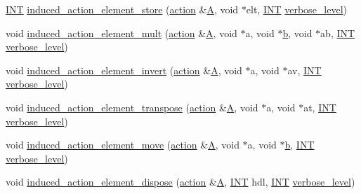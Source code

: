 \begin{DoxyCompactItemize}
\item 
\mbox{\hyperlink{galois_8h_a09fddde158a3a20bd2dcadb609de11dc}{I\+NT}} \mbox{\hyperlink{interface_8_c_a23d42fb239ba7e886b1fb9fc96f1a3be}{induced\+\_\+action\+\_\+element\+\_\+store}} (\mbox{\hyperlink{classaction}{action}} \&\mbox{\hyperlink{simeon_8_c_a97833f04c3a9c008df5521a2fc291bb4}{A}}, void $\ast$elt, \mbox{\hyperlink{galois_8h_a09fddde158a3a20bd2dcadb609de11dc}{I\+NT}} \mbox{\hyperlink{simeon_8_c_a818073fbcc2f439e7c56952f67386122}{verbose\+\_\+level}})
\item 
void \mbox{\hyperlink{interface_8_c_a7b00701d128922145960b4c15307113c}{induced\+\_\+action\+\_\+element\+\_\+mult}} (\mbox{\hyperlink{classaction}{action}} \&\mbox{\hyperlink{simeon_8_c_a97833f04c3a9c008df5521a2fc291bb4}{A}}, void $\ast$a, void $\ast$\mbox{\hyperlink{alphabet2_8_c_a148e3876077787926724625411d6e7a9}{b}}, void $\ast$ab, \mbox{\hyperlink{galois_8h_a09fddde158a3a20bd2dcadb609de11dc}{I\+NT}} \mbox{\hyperlink{simeon_8_c_a818073fbcc2f439e7c56952f67386122}{verbose\+\_\+level}})
\item 
void \mbox{\hyperlink{interface_8_c_a9b7e3c76b30897cb2b62a974e063ce12}{induced\+\_\+action\+\_\+element\+\_\+invert}} (\mbox{\hyperlink{classaction}{action}} \&\mbox{\hyperlink{simeon_8_c_a97833f04c3a9c008df5521a2fc291bb4}{A}}, void $\ast$a, void $\ast$av, \mbox{\hyperlink{galois_8h_a09fddde158a3a20bd2dcadb609de11dc}{I\+NT}} \mbox{\hyperlink{simeon_8_c_a818073fbcc2f439e7c56952f67386122}{verbose\+\_\+level}})
\item 
void \mbox{\hyperlink{interface_8_c_ad1379970ade84fe3a44f26f5ec500db4}{induced\+\_\+action\+\_\+element\+\_\+transpose}} (\mbox{\hyperlink{classaction}{action}} \&\mbox{\hyperlink{simeon_8_c_a97833f04c3a9c008df5521a2fc291bb4}{A}}, void $\ast$a, void $\ast$at, \mbox{\hyperlink{galois_8h_a09fddde158a3a20bd2dcadb609de11dc}{I\+NT}} \mbox{\hyperlink{simeon_8_c_a818073fbcc2f439e7c56952f67386122}{verbose\+\_\+level}})
\item 
void \mbox{\hyperlink{interface_8_c_a7b319593ee737d9c1ab5bc6223377541}{induced\+\_\+action\+\_\+element\+\_\+move}} (\mbox{\hyperlink{classaction}{action}} \&\mbox{\hyperlink{simeon_8_c_a97833f04c3a9c008df5521a2fc291bb4}{A}}, void $\ast$a, void $\ast$\mbox{\hyperlink{alphabet2_8_c_a148e3876077787926724625411d6e7a9}{b}}, \mbox{\hyperlink{galois_8h_a09fddde158a3a20bd2dcadb609de11dc}{I\+NT}} \mbox{\hyperlink{simeon_8_c_a818073fbcc2f439e7c56952f67386122}{verbose\+\_\+level}})
\item 
void \mbox{\hyperlink{interface_8_c_a5bf4e1daf5b0e799af9e065ab8046f99}{induced\+\_\+action\+\_\+element\+\_\+dispose}} (\mbox{\hyperlink{classaction}{action}} \&\mbox{\hyperlink{simeon_8_c_a97833f04c3a9c008df5521a2fc291bb4}{A}}, \mbox{\hyperlink{galois_8h_a09fddde158a3a20bd2dcadb609de11dc}{I\+NT}} hdl, \mbox{\hyperlink{galois_8h_a09fddde158a3a20bd2dcadb609de11dc}{I\+NT}} \mbox{\hyperlink{simeon_8_c_a818073fbcc2f439e7c56952f67386122}{verbose\+\_\+level}})

\end{DoxyCompactItemize}
